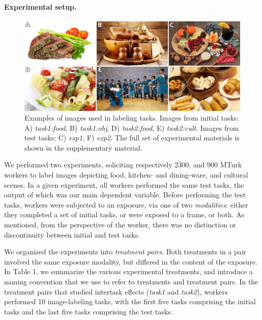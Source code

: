 \documentclass[12pt]{article}
\begin{document}
\paragraph{Experimental setup.}
\begin{figure}
	\centering
	\includegraphics[scale=0.7]{figs/images.jpg}
	\caption{
		Examples of images used in labeling tasks. Images from initial
		tasks: A) \textit{task1:food}, B) 
		\textit{task1:obj}, D) \textit{task2:food}, 
		E) \textit{task2:cult}.  Images from  test tasks: C) \textit{exp1}, 
		F) \textit{exp2}.  The full set of experimental materials is 
		shown in the supplementary material.
	}

	\label{fig:task}
\end{figure}
We performed two experiments, soliciting respectively 2300, and 900 MTurk 
workers to label images depicting food, kitchen- and dining-ware, and cultural
scenes.  In a given experiment, all workers performed the same test
tasks, the output of which was our main dependent variable.  Before performing
the test tasks, workers were subjected to an exposure, via one of 
two \textit{modalities}: either they completed a set of initial tasks, or 
were exposed to a frame, or both.  As mentioned, from the perspective of the worker, 
there was no distinction or discontinuity between initial and test tasks.

We organized the experiments into \textit{treatment pairs}.  Both treatments in a 
pair involved the same exposure modality, but differed in the
content of the exposure.  In Table 1, we summarize the various experimental
treatments, and introduce a naming convention that we use to refer to 
treatments and treatment pairs.
In the treatment pairs that studied intertask effects (\textit{task1} and
\textit{task2}), workers performed 10 image-labeling tasks, with the first 
five tasks comprising the initial tasks and the last five tasks comprising the
test tasks.
\end{document}

